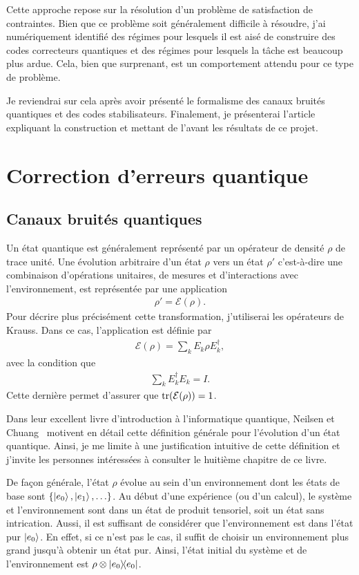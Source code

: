 Cette approche repose sur la résolution d'un problème de satisfaction de contraintes.
Bien que ce problème soit généralement difficile à résoudre,
j'ai numériquement identifié des régimes pour lesquels il est aisé de
construire des codes correcteurs quantiques
et des régimes pour lesquels la tâche est beaucoup plus ardue.
Cela, bien que surprenant, est un comportement attendu pour ce type de problème.

Je reviendrai sur cela après avoir présenté le formalisme des canaux bruités quantiques 
et des codes stabilisateurs.
Finalement,
je présenterai l'article expliquant la construction et 
mettant de l'avant les résultats de ce projet.

\section{Correction d'erreurs quantique}

\subsection{Canaux bruités quantiques}

Un état quantique est généralement représenté par un opérateur de densité $\rho$
de trace unité.
Une évolution arbitraire d'un état $\rho$ vers un état $\rho'$
c'est-à-dire une combinaison d'opérations unitaires,
de mesures et d'interactions avec l'environnement, 
est représentée par une application
\begin{align}
  \rho' = \mathcal{E}(\rho).
\end{align}
Pour décrire plus précisément cette transformation,
j'utiliserai les opérateurs de Krauss.
Dans ce cas,
l'application est définie par
\begin{align}
  \mathcal{E}(\rho) = \sum_{k} E_k \rho E_k^\dag,
\end{align}
avec la condition que 
\begin{align}
  \sum_k E_k^\dag E_k = I.
\end{align}
Cette dernière permet d'assurer que $\tr(\mathcal{E}(\rho)) = 1$.

Dans leur excellent livre d'introduction à l'informatique quantique, 
Neilsen et Chuang~\cite{nielsen_quantum_2010} motivent en détail 
cette définition générale pour l'évolution d'un état quantique.
Ainsi, je me limite à une justification intuitive de cette définition
et j'invite les personnes intéressées à consulter le huitième chapitre de ce livre.

De façon générale,
l'état $\rho$ évolue au sein d'un environnement dont les états de base 
sont $\qty{\ket{e_0}, \ket{e_1}, \ldots}$.
Au début d'une expérience (ou d'un calcul),
le système et l'environnement sont dans un état de produit tensoriel,
soit un état sans intrication.
Aussi, il est suffisant de considérer que l'environnement est dans l'état 
pur $\ket{e_0}$.
En effet,
si ce n'est pas le cas, il suffit de choisir un environnement plus grand jusqu'à 
obtenir un état pur.
Ainsi,
l'état initial du système et de l'environnement est $\rho \otimes \op{e_0}$.

